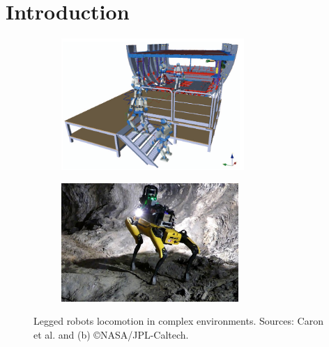 
\chapter{Introduction}
\label{chapter:intro}
\minitoc
\bigskip


\begin{figure}[h]
    \centering
    \captionsetup[subfigure]{justification=centering}
    \begin{subfigure}[t]{0.48\linewidth}
        \includegraphics[width=\textwidth,height=5cm]{Figures/Chapter_INTRO/caron_image_plane.png}
        \caption{}
        \label{fig:intro_0}
    \end{subfigure}
    \begin{subfigure}[t]{0.48\linewidth}
        \includegraphics[width=\textwidth,height=4.5cm]{Figures/Chapter_INTRO/darpa_nasa.jpg}
        \caption{}
        \label{fig:intro_1}
    \end{subfigure}
    \caption{Legged robots locomotion in complex environments. Sources: Caron et al. \cite{caron_plane_2016} and (b) \copyright NASA/JPL-Caltech.}
    \label{fig:intro}
\end{figure}

